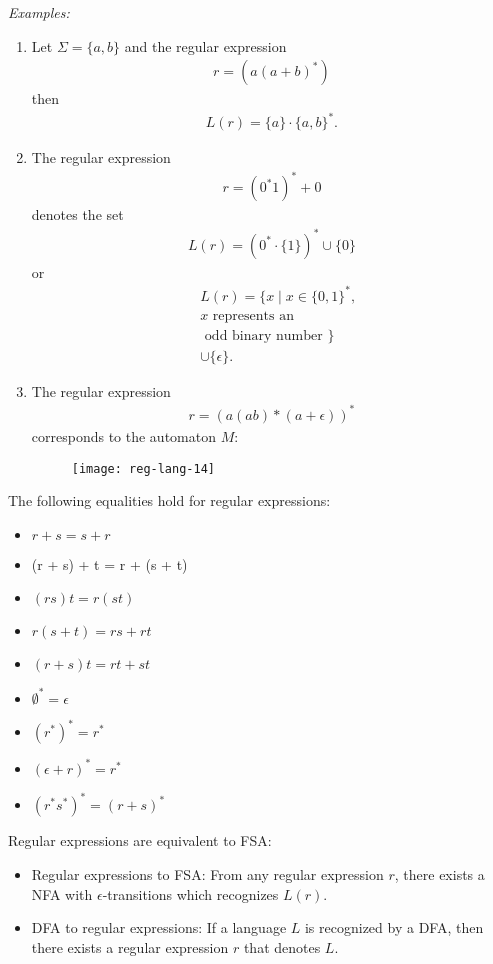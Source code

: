 \textit{Examples:}
\begin{enumerate}
  \item Let $\Sigma = \{a,b\}$ and the regular expression
        \begin{align*}
          r = (a ( a + b)^{*})
        \end{align*}
        then
        \begin{align*}
          L(r) = \{a\} \cdot \{a,b\}^{*}.
        \end{align*}
  \item The regular expression
        \begin{align*}
          r = (0^{*}1)^{*} + 0
        \end{align*}
        denotes the set
        \begin{align*}
          L(r) = ({0}^{*} \cdot \{1\})^{*} \cup \{0\}
        \end{align*}
        or
        \begin{align*}
          & L(r) = \{x \mid x \in \{0,1\}^{*} \text{,}\\
          & \text{$x$ represents an} \\
          & \text{ odd binary number }\}\\
          & \cup \{\epsilon\}.
        \end{align*}
    \item The regular expression
          \begin{align*}
            r = (a(ab)* (a+ \epsilon))^{*}
          \end{align*}
          corresponds to the automaton $M$:
          \begin{figure}[H]
            \centering
            \texttt{[image: reg-lang-14]}
          \end{figure}
\end{enumerate}
The following equalities hold for regular expressions:
\begin{itemize}
  \item $r + s = s + r$
  \item (r + s) + t = r + (s + t)
  \item $(rs)t = r(st)$
  \item $r(s + t) = rs + rt$
  \item $(r + s)t = rt + st$
  \item $\emptyset^{*} = \epsilon$
  \item $(r^{*})^{*} = r^{*}$
  \item $(\epsilon + r)^{*} = r^{*}$
  \item $(r^{*} s^{*})^{*} = (r+s)^{*}$
\end{itemize}
Regular expressions are equivalent to FSA: 
\begin{itemize}
  \item Regular expressions to FSA: From any regular expression $r$, there exists a NFA
  with $\epsilon$-transitions which recognizes $L(r)$. 
  \item DFA to regular expressions: If a language $L$ is recognized by a DFA, then there exists a regular
        expression $r$ that denotes $L$.
\end{itemize}
